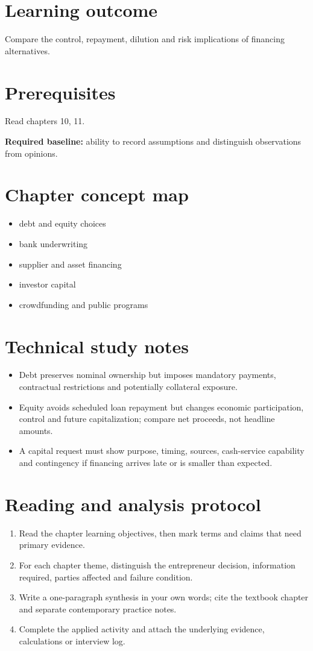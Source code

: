\documentclass[11pt,letterpaper]{article}
\begin{document}
\SuiteOpen
\section{Learning outcome}
Compare the control, repayment, dilution and risk implications of financing alternatives.
\section{Prerequisites}
Read chapters 10, 11.\par\textbf{Required baseline:} ability to record assumptions and distinguish observations from opinions.
\section{Chapter concept map}
\begin{itemize}[leftmargin=*,itemsep=3pt]
\item debt and equity choices
\item bank underwriting
\item supplier and asset financing
\item investor capital
\item crowdfunding and public programs
\end{itemize}

\section{Technical study notes}
\begin{itemize}[leftmargin=*,itemsep=3pt]
\item Debt preserves nominal ownership but imposes mandatory payments, contractual restrictions and potentially collateral exposure.
\item Equity avoids scheduled loan repayment but changes economic participation, control and future capitalization; compare net proceeds, not headline amounts.
\item A capital request must show purpose, timing, sources, cash-service capability and contingency if financing arrives late or is smaller than expected.
\end{itemize}

\section{Reading and analysis protocol}
\begin{enumerate}[leftmargin=*,itemsep=5pt]
\item Read the chapter learning objectives, then mark terms and claims that need primary evidence.
\item For each chapter theme, distinguish the entrepreneur decision, information required, parties affected and failure condition.
\item Write a one-paragraph synthesis in your own words; cite the textbook chapter and separate contemporary practice notes.
\item Complete the applied activity and attach the underlying evidence, calculations or interview log.
\end{enumerate}
\end{document}
